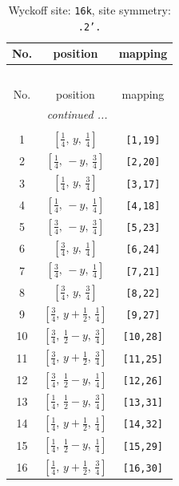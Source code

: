 \documentclass[fleqn,8pt]{jsarticle}
\begin{document}
\renewcommand{\arraystretch}{1.2}
\begin{longtable}{ccc}
\caption{Wyckoff site: {\tt 16k}, site symmetry: {\tt .2'.}}
 \\
 \hline \hline
No. & position & mapping \\ \hline \endfirsthead

\multicolumn{2}{l}{\tablename\ \thetable{}} \\
 \hline \hline
No. & position & mapping \\ \hline \endhead

 \hline \hline
\multicolumn{2}{r}{\footnotesize\it continued ...} \\ \endfoot

 \hline \hline
\multicolumn{2}{r}{} \\ \endlastfoot

1 & $\left[ \frac{1}{4},\, y,\, \frac{1}{4} \right]$ & {\tt [1,19]} \\ \hline
2 & $\left[ \frac{1}{4},\, - y,\, \frac{3}{4} \right]$ & {\tt [2,20]} \\ \hline
3 & $\left[ \frac{1}{4},\, y,\, \frac{3}{4} \right]$ & {\tt [3,17]} \\ \hline
4 & $\left[ \frac{1}{4},\, - y,\, \frac{1}{4} \right]$ & {\tt [4,18]} \\ \hline
5 & $\left[ \frac{3}{4},\, - y,\, \frac{3}{4} \right]$ & {\tt [5,23]} \\ \hline
6 & $\left[ \frac{3}{4},\, y,\, \frac{1}{4} \right]$ & {\tt [6,24]} \\ \hline
7 & $\left[ \frac{3}{4},\, - y,\, \frac{1}{4} \right]$ & {\tt [7,21]} \\ \hline
8 & $\left[ \frac{3}{4},\, y,\, \frac{3}{4} \right]$ & {\tt [8,22]} \\ \hline
9 & $\left[ \frac{3}{4},\, y + \frac{1}{2},\, \frac{1}{4} \right]$ & {\tt [9,27]} \\ \hline
10 & $\left[ \frac{3}{4},\, \frac{1}{2} - y,\, \frac{3}{4} \right]$ & {\tt [10,28]} \\ \hline
11 & $\left[ \frac{3}{4},\, y + \frac{1}{2},\, \frac{3}{4} \right]$ & {\tt [11,25]} \\ \hline
12 & $\left[ \frac{3}{4},\, \frac{1}{2} - y,\, \frac{1}{4} \right]$ & {\tt [12,26]} \\ \hline
13 & $\left[ \frac{1}{4},\, \frac{1}{2} - y,\, \frac{3}{4} \right]$ & {\tt [13,31]} \\ \hline
14 & $\left[ \frac{1}{4},\, y + \frac{1}{2},\, \frac{1}{4} \right]$ & {\tt [14,32]} \\ \hline
15 & $\left[ \frac{1}{4},\, \frac{1}{2} - y,\, \frac{1}{4} \right]$ & {\tt [15,29]} \\ \hline
16 & $\left[ \frac{1}{4},\, y + \frac{1}{2},\, \frac{3}{4} \right]$ & {\tt [16,30]} \\
\end{longtable}
\end{document}
